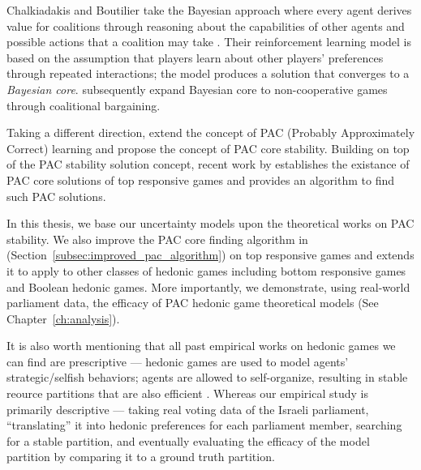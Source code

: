 Chalkiadakis and Boutilier take the Bayesian approach where every agent derives
value for coalitions through reasoning about the capabilities of other agents
and possible actions that a coalition may take
\cite{Chalkiadakis2004, Chalkiadakis:2008:SDM:1402383.1402435}.
Their reinforcement learning model is based on the assumption that players
learn about other players' preferences through repeated interactions; the model
produces a solution that converges to a \textit{Bayesian core}.
 subsequently expand Bayesian core to
non-cooperative games through coalitional bargaining.

Taking a different direction, 
extend the concept of PAC (Probably Approximately Correct) learning and
propose the concept of PAC core stability.
Building on top of the PAC stability solution concept, recent work by
 establishes the existance of PAC core solutions
of top responsive games and provides an algorithm to find such PAC solutions.

In this thesis, we base our uncertainty models upon the theoretical works on
PAC stability.
We also improve the PAC core finding algorithm in \cite{ijcai2017-380}
(Section~\ref{subsec:improved_pac_algorithm}) on top responsive games and
extends it to apply to other classes of hedonic games including bottom
responsive games and Boolean hedonic games.
More importantly, we demonstrate, using real-world parliament data, the
efficacy of PAC hedonic game theoretical models (See Chapter~\ref{ch:analysis}).

It is also worth mentioning that all past empirical works on hedonic games we
can find are prescriptive --- hedonic games are used to model agents'
strategic/selfish behaviors; agents are allowed to self-organize, resulting in
stable reource partitions that are also efficient
\cite{5674046, 5137409, 6846512}.
Whereas our empirical study is primarily descriptive --- taking real voting
data of the Israeli parliament, ``translating'' it into hedonic preferences for
each parliament member, searching for a stable partition, and eventually
evaluating the efficacy of the model partition by comparing it to a ground
truth partition.
